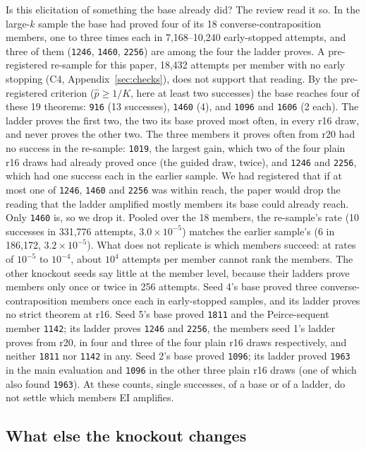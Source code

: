 Is this elicitation of something the base already did? The review read it so. In the large-$k$ sample the base had
proved four of its 18 converse-contraposition members, one to three times each in 7,168--10,240 early-stopped attempts,
and three of them (\texttt{1246}, \texttt{1460}, \texttt{2256}) are among the four the ladder proves. A pre-registered
re-sample for this paper, 18,432 attempts per member with no early stopping (C4, Appendix~\ref{sec:checks}), does not
support that reading. By the pre-registered criterion ($\hat p \geq 1/K$, here at least two successes) the base reaches
four of these 19 theorems: \texttt{916} (13 successes), \texttt{1460} (4), and \texttt{1096} and \texttt{1606} (2 each).
The ladder proves the first two, the two its base proved most often, in every r16 draw, and never proves the other two.
The three members it proves often from r20 had no success in the re-sample: \texttt{1019}, the largest gain, which two
of the four plain r16 draws had already proved once (the guided draw, twice), and \texttt{1246} and \texttt{2256}, which had one success each in the
earlier sample. We had registered that if at most one of \texttt{1246}, \texttt{1460} and
\texttt{2256} was within reach, the paper would drop the reading that the ladder amplified mostly members its base could
already reach. Only \texttt{1460} is, so we drop it. Pooled over the 18 members, the re-sample's rate (10 successes in
331,776 attempts, $3.0\times10^{-5}$) matches the earlier sample's (6 in 186,172, $3.2\times10^{-5}$). What does not
replicate is which members succeed: at rates of $10^{-5}$ to $10^{-4}$, about $10^4$ attempts per member cannot rank
the members. The other knockout seeds say little at the member level, because their ladders prove members only once or twice in
256 attempts. Seed 4's base proved three converse-contraposition members once each in early-stopped samples, and its
ladder proves no strict theorem at r16. Seed 5's base proved \texttt{1811} and the Peirce-sequent member \texttt{1142}; its ladder proves \texttt{1246} and
\texttt{2256}, the members seed 1's ladder proves from r20, in four and three of the four plain r16 draws respectively, and
neither \texttt{1811} nor \texttt{1142} in any. Seed
2's base proved \texttt{1096}; its ladder proved \texttt{1963} in the main evaluation and \texttt{1096} in the other
three plain r16 draws (one of which also found \texttt{1963}).
At these counts, single successes, of a base or of a ladder, do not settle which members EI amplifies.

\subsection{What else the knockout changes}
\label{sec:side}

